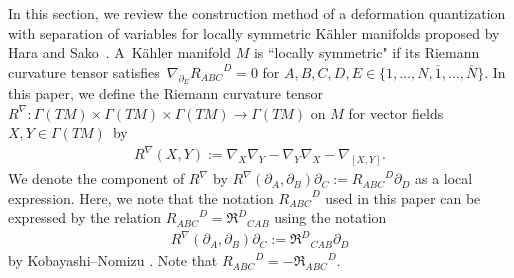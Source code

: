 \documentclass[10pt,a4paper]{amsart}
\numberwithin{equation}{section}
\begin{document}
In this section, we review the construction method of a deformation quantization with separation of variables for locally symmetric K\"ahler manifolds proposed by Hara and Sako~\cite{HS1,HS2}. A~K\"ahler manifold $M$ is ``locally symmetric" if its Riemann curvature tensor satisfies~$
\nabla_{\partial_{E}}
{R_{ABC}}^{D}\allowbreak
=
0
$
for
$
A,
B,
C,
D,
E
\in
\bigl\{
1,\dots,N,
\overline{1},\dots,\overline{N}
\bigr\}
$.
In this paper, we define the Riemann curvature tensor
$
R^{\nabla}
\colon
\Gamma(TM)
\times
\Gamma(TM)
\times
\Gamma(TM)
\to
\Gamma(TM)
$
on $M$ for vector fields~${
X,Y
\in
\Gamma(TM)
}$~by
\begin{align*}
R^{\nabla}
 (X,Y )
:=
\nabla_{X}
\nabla_{Y}
-
\nabla_{Y}
\nabla_{X}
-
\nabla_{[X,Y]}.
\end{align*}
We denote the component of $R^{\nabla}$ by
$
R^{\nabla}
 (
\partial_{A},
\partial_{B}
 )
\partial_{C}
:=
{R_{ABC}}^{D}
\partial_{D}
$
as a local expression. Here, we note that the notation ${R_{ABC}}^{D}$ used in this paper can be expressed by the relation
$
{R_{ABC}}^{D}
=
{\mathfrak{R}^{D}}_{CAB}
$
using the notation
\begin{align}
R^{\nabla}
 (
\partial_{A},
\partial_{B}
 )
\partial_{C}
:=
{\mathfrak{R}^{D}}_{CAB}
\partial_{D}
\label{Riem_curv_KN}
\end{align}
by Kobayashi--Nomizu \cite{KN}. Note that
${R_{ABC}}^{D}=-{\mathfrak{R}_{ABC}}^{D}$.
\end{document}
